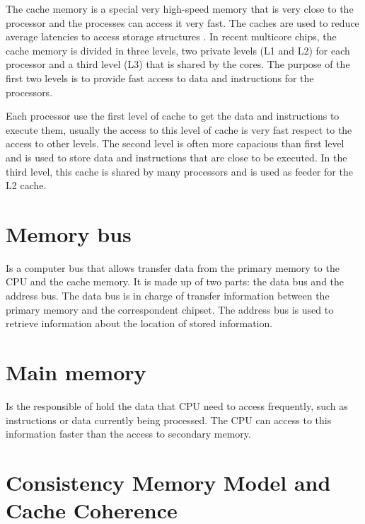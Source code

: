 \documentclass[openany, a4paper]{book}
\theoremstyle{break}
\theoremstyle{example}
\theoremstyle{note}
\theoremstyle{break}
\theoremstyle{exercise}
\begin{document}
The cache memory is a special very high-speed memory that is very close to
the processor and the processes can access it very fast. The caches are used
to reduce average latencies to access storage structures
\cite{DBLP_series_synthesis_2020Nagarajan}. In recent multicore chips, the
cache memory is divided in three levels, two private levels (L1 and L2) for
each processor and a third level (L3) that is shared by the cores. The
purpose of the first two levels is to provide fast access to data and
instructions for the processors.

Each processor use the first level of cache to get the data and instructions
to execute them, usually the access to this level of cache is very fast
respect to the access to other levels.  The second level is often more
capacious than first level and is used to store data and instructions that
are close to be executed. In the third level, this cache is shared by many
processors and is used as feeder for the L2 cache.

\section{Memory bus}
\label{sec:org6fddf85}

Is a computer bus that allows transfer data from the primary memory to the
CPU and the cache memory. It is made up of two parts: the data bus and the
address bus. The data bus is in charge of transfer information between the
primary memory and the correspondent chipset.
The address bus is used to retrieve information about the location of stored
information.


\section{Main memory}
\label{sec:org1f977fc}

Is the responsible of hold the data that CPU need to access frequently, such
as instructions or data currently being processed. The CPU can access to
this information faster than the access to secondary memory.

\section{Consistency Memory Model and Cache Coherence}
\label{sec:orgf668de9}
\end{document}
